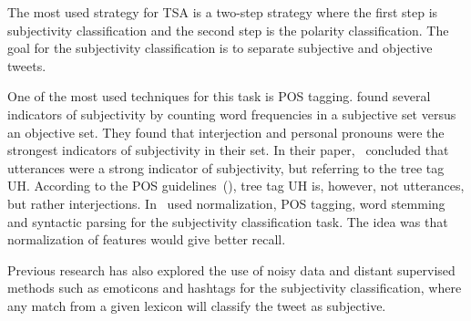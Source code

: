 The most used strategy for TSA is a two-step strategy where the first step is subjectivity classification and the second step is the polarity classification. The goal for the subjectivity classification is to separate subjective and objective tweets.

One of the most used techniques for this task is POS tagging. \cite{article:pak} found several indicators of subjectivity by counting word frequencies in a subjective set versus an objective set. They found that interjection and personal pronouns were the strongest indicators of subjectivity in their set. In their paper,~\cite{article:pak} concluded that utterances were a strong indicator of subjectivity, but referring to the tree tag UH. According to the POS guidelines~(\cite{treebank}), tree tag UH is, however, not utterances, but rather interjections. In~\cite{article:jiang} used normalization, POS tagging, word stemming and syntactic parsing for the subjectivity classification task. The idea was that normalization of features would give better recall.

Previous research has also explored the use of noisy data and distant supervised methods such as emoticons and hashtags for the subjectivity classification, where any match from a given lexicon will classify the tweet as subjective.
